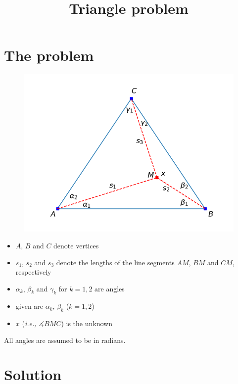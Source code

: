 \documentclass[12pt,a4paper]{article}
\title{Triangle problem}
\begin{document}
\maketitle

\section{The problem}

\begin{figure}[th]
  \includegraphics[width=1\textwidth]{figs/problem_statement.png}
\end{figure}

\begin{itemize}
\item $A$, $B$ and $C$ denote vertices
\item $s_1$, $s_2$ and $s_3$ denote the lengths of the line segments $AM$, $BM$ and $CM$, respectively
\item $\alpha_k$, $\beta_k$ and $\gamma_k$ for $k=1,2$ are angles
\item given are $\alpha_k$, $\beta_k$ ($k=1,2$)
\item $x$ (\emph{i.e.,} $\measuredangle BMC$) is the unknown
\end{itemize}

All angles are assumed to be in radians.

\section{Solution}
\end{document}
